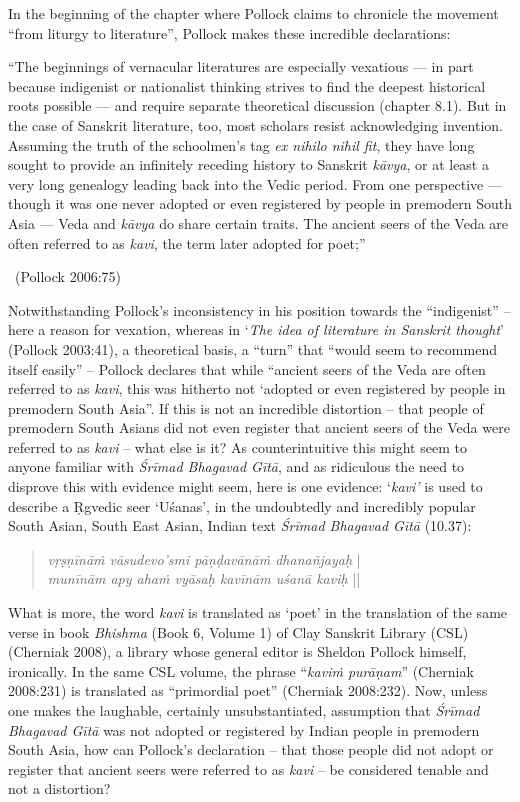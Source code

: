 In the beginning of the chapter where Pollock claims to chronicle the movement “from liturgy to literature”, Pollock makes these incredible declarations:

\begin{myquote}
“The beginnings of vernacular literatures are especially vexatious — in part because indigenist or nationalist thinking strives to find the deepest historical roots possible — and require separate theoretical discussion (chapter 8.1). But in the case of Sanskrit literature, too, most scholars resist acknowledging invention. Assuming the truth of the schoolmen’s tag \textit{ex nihilo nihil fit}, they have long sought to provide an infinitely receding history to Sanskrit \textit{kāvya}, or at least a very long genealogy leading back into the Vedic period. From one perspective — though it was one never adopted or even registered by people in premodern South Asia — Veda and \textit{kāvya} do share certain traits. The ancient seers of the Veda are often referred to as \textit{kavi}, the term later adopted for poet;” 

~\hfill (Pollock 2006:75)
\end{myquote}

Notwithstanding Pollock’s inconsistency in his position towards the “indigenist” – here a reason for vexation, whereas in ‘\textit{The idea of literature in Sanskrit thought}’ (Pollock 2003:41), a theoretical basis, a “turn” that “would seem to recommend itself easily” – Pollock declares that while “ancient seers of the Veda are often referred to as \textit{kavi}, this was hitherto not ‘adopted or even registered by people in premodern South Asia”. If this is not an incredible distortion – that people of premodern South Asians did not even register that ancient seers of the Veda were referred to as \textit{kavi} – what else is it? As counterintuitive this might seem to anyone familiar with \textit{Śrīmad Bhagavad Gītā}, and as ridiculous the need to disprove this with evidence might seem, here is one evidence: ‘\textit{kavi’} is used to describe a Ṛgvedic seer ‘Uśanas’, in the undoubtedly and incredibly popular South Asian, South East Asian, Indian text \textit{Śrīmad Bhagavad Gītā} (10.37):

\begin{verse}
\textit{vṛṣṇīnāṁ vāsudevo’smi pāṇḍavānāṁ dhanañjayaḥ} |\\\textit{munīnām apy ahaṁ vyāsaḥ kavīnām uśanā kaviḥ} ||
\end{verse}

What is more, the word \textit{kavi} is translated as ‘poet’ in the translation of the same verse in book \textit{Bhishma} (Book 6, Volume 1) of Clay Sanskrit Library (CSL) (Cherniak 2008), a library whose general editor is Sheldon Pollock himself, ironically. In the same CSL volume, the phrase “\textit{kaviṁ purāṇam}” (Cherniak 2008:231) is translated as “primordial poet” (Cherniak 2008:232). Now, unless one makes the laughable, certainly unsubstantiated, assumption that \textit{Śrīmad} \textit{Bhagavad Gītā} was not adopted or registered by Indian people in premodern South Asia, how can Pollock’s declaration – that those people did not adopt or register that ancient seers were referred to as \textit{kavi} – be considered tenable and not a distortion?


